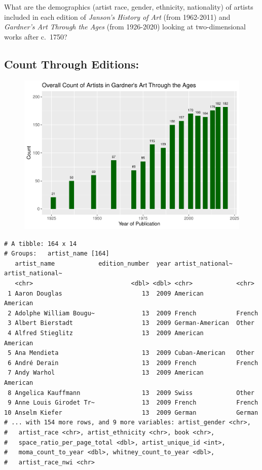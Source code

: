 \documentclass[
  letterpaper,
  DIV=11,
  numbers=noendperiod]{scrreprt}
\begin{document}
What are the demographics (artist race, gender, ethnicity, nationality)
of artists included in each edition of \emph{Janson's History of Art}
(from 1962-2011) and \emph{Gardner's Art Through the Ages} (from
1926-2020) looking at two-dimensional works after c.~1750?

\hypertarget{count-through-editions}{%
\subsection{\texorpdfstring{\textbf{Count Through
Editions:}}{Count Through Editions:}}\label{count-through-editions}}

\begin{figure}

{\centering \includegraphics{Chapter1/Chapter1_files/figure-pdf/gardnercountthroughtime-1.pdf}

}

\end{figure}

\begin{verbatim}
# A tibble: 164 x 14
# Groups:   artist_name [164]
   artist_name            edition_number  year artist_national~ artist_national~
   <chr>                           <dbl> <dbl> <chr>            <chr>           
 1 Aaron Douglas                      13  2009 American         American        
 2 Adolphe William Bougu~             13  2009 French           French          
 3 Albert Bierstadt                   13  2009 German-American  Other           
 4 Alfred Stieglitz                   13  2009 American         American        
 5 Ana Mendieta                       13  2009 Cuban-American   Other           
 6 André Derain                       13  2009 French           French          
 7 Andy Warhol                        13  2009 American         American        
 8 Angelica Kauffmann                 13  2009 Swiss            Other           
 9 Anne Louis Girodet Tr~             13  2009 French           French          
10 Anselm Kiefer                      13  2009 German           German          
# ... with 154 more rows, and 9 more variables: artist_gender <chr>,
#   artist_race <chr>, artist_ethnicity <chr>, book <chr>,
#   space_ratio_per_page_total <dbl>, artist_unique_id <int>,
#   moma_count_to_year <dbl>, whitney_count_to_year <dbl>,
#   artist_race_nwi <chr>
\end{verbatim}
\end{document}

